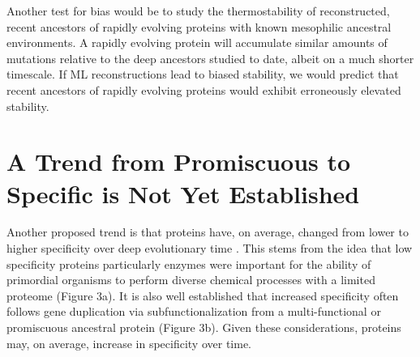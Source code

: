 Another test for bias would be to study the thermostability of reconstructed,
recent ancestors of rapidly evolving proteins with known mesophilic
ancestral environments. A rapidly evolving protein will accumulate
similar amounts of mutations relative to the deep ancestors studied
to date, albeit on a much shorter timescale. If ML reconstructions
lead to biased stability, we would predict that recent ancestors of
rapidly evolving proteins would exhibit erroneously elevated stability.

\section{A Trend from Promiscuous to Specific is Not Yet Established}

Another proposed trend is that proteins have, on average, changed
from lower to higher specificity over deep evolutionary time \cite{risso_hyperstability_2013,risso_thermostable_2014}.
This stems from the idea that low specificity proteins \textemdash{}
particularly enzymes \textemdash{} were important for the ability
of primordial organisms to perform diverse chemical processes with
a limited proteome \cite{jensen_enzyme_1976} (Figure 3a). It is also
well established that increased specificity often follows gene duplication
via subfunctionalization from a multi-functional or promiscuous ancestral
protein \cite{lynch_probability_2000,conant_turning_2008} (Figure
3b). Given these considerations, proteins may, on average, increase
in specificity over time.


